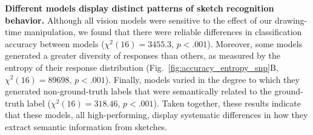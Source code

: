 \documentclass{article}
\begin{document}



\textbf{Different models display distinct patterns of sketch recognition behavior.}
Although all vision models were sensitive to the effect of our drawing-time manipulation, we found that there were reliable differences in classification accuracy between models ($\chi^2(16) = 3455.3$, $p<.001$). %
Moreover, some models generated a greater diversity of responses than others, as measured by the entropy of their response distribution (Fig.~\ref{fig:accuracy_entropy_snp}B, $\chi^2(16) = 89698$, $p<.001$). %
Finally, models varied in the degree to which they generated non-ground-truth labels that were semantically related to the ground-truth label ($\chi^2(16)=318.46$, $p<.001$). 
Taken together, these results indicate that these models, all high-performing, display systematic differences in how they extract semantic information from sketches. 




\end{document}
